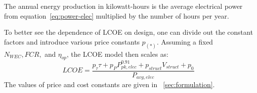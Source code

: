 The annual energy production in kilowatt-hours is the average electrical power from equation~\eqref{eq:power-elec} multiplied by the number of hours per year.

To better see the dependence of LCOE on design, one can divide out the constant factors and introduce various price constants $p_{(*)}$.
Assuming a fixed $N_{WEC}, FCR,$ and $\eta_{op}$, the LCOE model then scales as:
\begin{equation}\label{eq:LCOE-scale}
  LCOE = \frac{p_\tau \tau + p_{P}P_{pk,elec}^{0.91} + p_{struct} V_{struct} + p_0}{P_{avg,elec}}
\end{equation}
The values of price and cost constants are given in \sectionautorefname~\ref{sec:formulation}.



